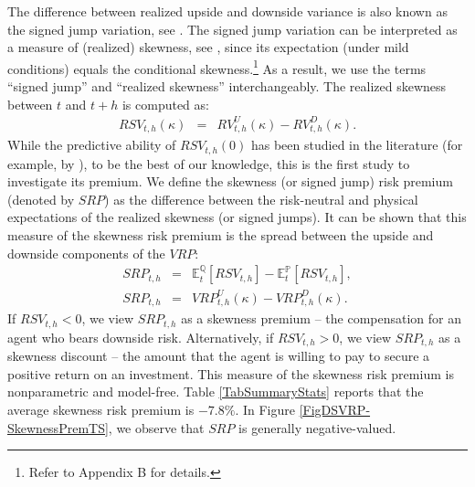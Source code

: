 \documentclass[11pt]{article}
\begin{document}
The difference between realized upside and downside variance is also known as the signed jump variation, see \cite{PattonSheppard13REStat}. The signed jump variation can be interpreted as a measure of (realized) skewness, see \citet*{FJPT13RoF, FJPT14EJF}, since its expectation (under mild conditions) equals the conditional skewness.\footnote{Refer to Appendix B for details.} As a result, we use the terms ``signed jump'' and ``realized skewness'' interchangeably. The realized skewness between $t$ and $t+h$ is computed as:
\begin{eqnarray}
RSV_{t,h}(\kappa) &=&RV_{t,h}^{U}(\kappa )-RV_{t,h}^{D}(\kappa).  \label{EqDSSV}
\end{eqnarray}
While the predictive ability of $RSV_{t,h}(0)$ has been studied in the literature (for example, by \citealp{GuoWangZhou15GoodBadJump}), to be the best of our knowledge, this is the first study to investigate its premium. We define the skewness (or signed jump) risk premium (denoted by $SRP$) as the difference between the risk-neutral and physical expectations of the realized skewness (or signed jumps). It can be shown that this measure of the skewness risk premium is the spread between the upside and downside components of the $VRP$:
\begin{eqnarray}
SRP_{t,h} &=&\mathbb{E}^{\mathbb{Q}}_{t}[RSV_{t,h}]-\mathbb{E}^{\mathbb{P}}_{t}[RSV_{t,h}], \nonumber\\
SRP_{t,h}&=&VRP_{t,h}^{U}(\kappa )-VRP_{t,h}^{D}(\kappa ).\label{EqSkewRiskPrem}
\end{eqnarray}
If $RSV_{t,h}<0$, we view $SRP_{t,h}$ as a skewness premium -- the compensation for an agent who bears downside risk. Alternatively, if $RSV_{t,h}>0$, we view $SRP_{t,h}$ as a skewness discount -- the amount that the agent is willing to pay to secure a positive return on an investment. This measure of the skewness risk premium is nonparametric and model-free. Table \ref{TabSummaryStats} reports that the average skewness risk premium is $-7.8\%$. In Figure \ref{FigDSVRP-SkewnessPremTS}, we observe that $SRP$ is generally negative-valued.
\end{document}
